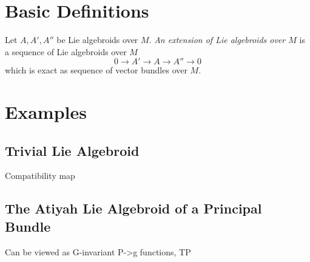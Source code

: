\section{Basic Definitions}

\begin{definition} 

\end{definition}

\begin{definition} 

\end{definition}

\begin{definition} 
Let $A, A', A''$ be Lie algebroids over $M$. \emph{An extension of Lie algebroids over $M$} is a sequence of Lie algebroids over $M$ \[ 0 \to A' \to A \to A'' \to 0 \] which is exact as sequence of vector bundles over $M$.

\end{definition}

\section{Examples}

\subsection{Trivial Lie Algebroid}

Compatibility map

\subsection{The Atiyah Lie Algebroid of a Principal Bundle}

Can be viewed as G-invariant P->g functions, TP 


